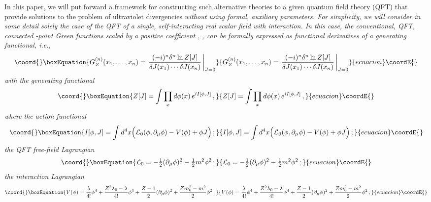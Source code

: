 \documentclass[a4paper,12pt]{article}
\providecommand{\half}{{\textstyle{1\over2}}}
\providecommand{\polje}{\phi}
\providecommand{\akcija}{I}
\providecommand{\Lag}{{\cal L}}
\providecommand{\Lagf}{\Lag_{0}}
\providecommand{\Lagi}{V}
\providecommand{\Gf}{G^{(n)}}
\providecommand{\GfZ}{\Gf_Z}
\begin{document}
In this paper, we will put forward a framework for constructing such alternative theories to a given quantum field theory (QFT) that provide solutions to the problem of ultraviolet divergencies \it without using formal, auxiliary parameters. \rm For simplicity, we will consider in some detail solely the case of the QFT of a single, self-interacting real scalar field \myHighlight{$\polje(x)$}\coordHE{} with \myHighlight{$\polje^4$}\coordHE{} interaction. In this case, the conventional, QFT, connected \coordHE{}-point Green functions scaled by a positive coefficient \coordHE{}, \myHighlight{$\GfZ(x_1,\ldots, x_n)$}\coordHE{}, can be formally expressed as functional derivatives of a generating functional, i.e.,
\begin{equation}\coord{}\boxEquation{
  \GfZ(x_1,\ldots, x_n) = \left. { (-i)^{n} \delta^n \ln Z[J] \over\delta J(x_1) \cdots \delta J(x_n) }\, \right|_{J = 0} 
  \label{Greendef}
}{
  \GfZ(x_1,\ldots, x_n) = \left. { (-i)^{n} \delta^n \ln Z[J] \over\delta J(x_1) \cdots \delta J(x_n) }\, \right|_{J = 0} 
  }{ecuacion}\coordE{}\end{equation}
with the generating functional
\begin{equation}\coord{}\boxEquation{
   Z[J] = \int \prod_{x} d\polje(x) \, e^{ i \akcija[\polje,J] } \,,
  \label{genfunc}
}{
   Z[J] = \int \prod_{x} d\polje(x) \, e^{ i \akcija[\polje,J] } \,,
  }{ecuacion}\coordE{}\end{equation}
where the action functional
\begin{equation}\coord{}\boxEquation{
   \akcija[\polje,J] = \int d^4x \Bigl ( \Lagf(\polje, \partial_\mu \polje) - \Lagi(\polje) + \polje J \Bigr) \,;
   \label{QFTaction}
}{
   \akcija[\polje,J] = \int d^4x \Bigl ( \Lagf(\polje, \partial_\mu \polje) - \Lagi(\polje) + \polje J \Bigr) \,;
   }{ecuacion}\coordE{}\end{equation}
the QFT free-field Lagrangian 
\begin{equation}\coord{}\boxEquation{
   \Lagf = - \half (\partial_\mu \polje)^2 - \half m^2 \polje^2 \,;
   \label{QFTfreelagr}
}{
   \Lagf = - \half (\partial_\mu \polje)^2 - \half m^2 \polje^2 \,;
   }{ecuacion}\coordE{}\end{equation}
the interaction Lagrangian
\begin{equation}\coord{}\boxEquation{
   \Lagi(\polje) = {\lambda \over 4!} \polje^4 + {Z^2\lambda_0 -\lambda \over 4!} \polje^4 + {Z - 1\over 2} (\partial_\mu \polje)^2 
               + {Z m_0^2 - m^2\over 2} \polje^2 \,;
   \label{QFTintlagr}
}{
   \Lagi(\polje) = {\lambda \over 4!} \polje^4 + {Z^2\lambda_0 -\lambda \over 4!} \polje^4 + {Z - 1\over 2} (\partial_\mu \polje)^2 
               + {Z m_0^2 - m^2\over 2} \polje^2 \,;
   }{ecuacion}\coordE{}\end{equation}
\end{document}
